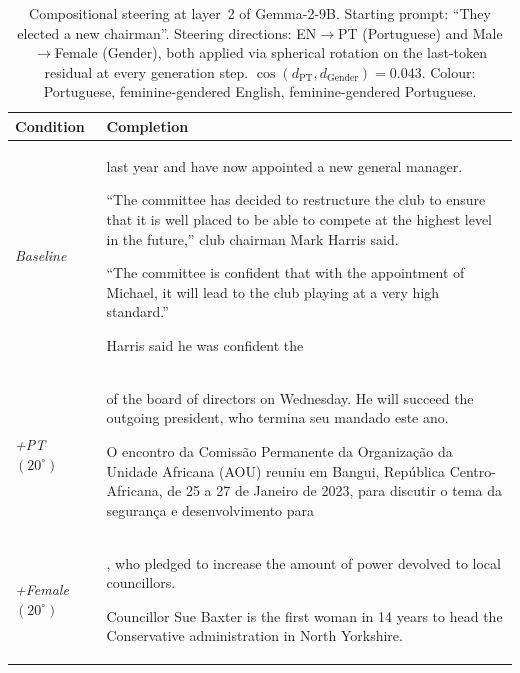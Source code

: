 

\newcommand{\pt}[1]{\textcolor{ptblue}{#1}}
\newcommand{\fm}[1]{\textcolor{femred}{#1}}
\newcommand{\ptfm}[1]{\textcolor{ptfem}{#1}}

\begin{table}[t]
\centering
\small
\caption{Compositional steering at layer~2 of Gemma-2-9B. Starting prompt:
  ``They elected a new chairman''. Steering directions: EN$\to$PT (Portuguese)
  and Male$\to$Female (Gender), both applied via spherical rotation on the
  last-token residual at every generation step. $\cos(d_{\mathrm{PT}}, d_{\mathrm{Gender}}) = 0.043$.
  Colour: \pt{Portuguese}, \fm{feminine-gendered English}, \ptfm{feminine-gendered Portuguese}.}
\label{tab:composition}
\begin{tabular}{@{}lp{}@{}}
\toprule
\textbf{Condition} & \textbf{Completion} \\
\midrule
\emph{Baseline} & last year and have now appointed a new general manager.\par
``The committee has decided to restructure the club to ensure that it is well placed to be able to compete at the highest level in the future,'' club chairman Mark Harris said.\par
``The committee is confident that with the appointment of Michael, it will lead to the club playing at a very high standard.''\par
Harris said he was confident the \\
\addlinespace[3pt]
\emph{+PT $(20^\circ)$} & of the board of directors on Wednesday. He will succeed the outgoing president, who \pt{termina seu mandado este ano}.\par
\pt{O encontro da Comiss\~ao Permanente da Organiza\c{c}\~ao da Unidade Africana (AOU) reuniu em Bangui, Rep\'ublica Centro-Africana, de 25 a 27 de Janeiro de 2023, para discutir o tema da seguran\c{c}a e desenvolvimento para} \\
\addlinespace[3pt]
\emph{+Female $(20^\circ)$} & , who pledged to increase the amount of power devolved to local councillors.\par
Councillor \fm{Sue} Baxter is the first \fm{woman} in 14 years to head the Conservative administration in North Yorkshire.\par

\end{tabular}
\end{table}
